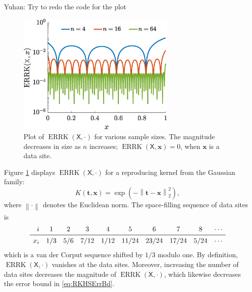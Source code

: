 \documentclass[]{mcom-l}
\theoremstyle{theorem}
\theoremstyle{remark}
\DeclareMathOperator{\errK}{ERRK}
\newcommand{\mX}{\mathsf{X}}
\newcommand{\bx}{{\boldsymbol{x}}}
\newcommand{\bt}{{\boldsymbol{t}}}
\newcommand{\norm}[2][{}]{\ensuremath{\left \lVert #2 \right \rVert}_{#1}}
\newcommand{\YuhanNote}[1]{{\color{magenta}Yuhan: #1}}
\begin{document}
\YuhanNote{Try to redo the code for the plot }
\begin{figure}[H]
	\centering
	\includegraphics[height =6cm]{ProgramsImages/errKplot.eps}
	\caption{Plot of $\errK(\mX,\cdot)$ for various sample sizes.  The magnitude decreases in size as $n$ increases; $\errK(\mX,\bx) = 0$, when $\bx$ is a data site. \label{fig:errK}}
\end{figure}

Figure \ref{fig:errK} displays   $\errK(\mX,\cdot)$  for a reproducing kernel from the Gaussian family: 
	\begin{equation} \label{eq:GaussianOne}
K(\bt,\bx) =  \exp(-\norm[2]{\bt-\bx}^2),
\end{equation}
where $\norm{\cdot}$ denotes the Euclidean norm.  The space-filling sequence of data sites is 
\begin{equation} \label{eq:FixedVDCDes}
\begin{array}{rccccccccc}
i  & 1 & 2 & 3 & 4 & 5 & 6 & 7 & 8 & \cdots\\
\midrule
x_i & 1/3 & 5/6 & 7/12 & 1/12 & 11/24 & 23/24 & 17/24 & 5 /24 & \cdots
\end{array}
\end{equation}
which is a van der Corput sequence \cite{} shifted by $1/3$ modulo one.  By definition, $\errK(\mX,\cdot)$ vanishes at the data sites.  Moreover, increasing the number of data sites decreases the magnitude of $\errK(\mX,\cdot)$, which likewise decreases the error bound in \eqref{eq:RKHSErrBd}.
\end{document}
